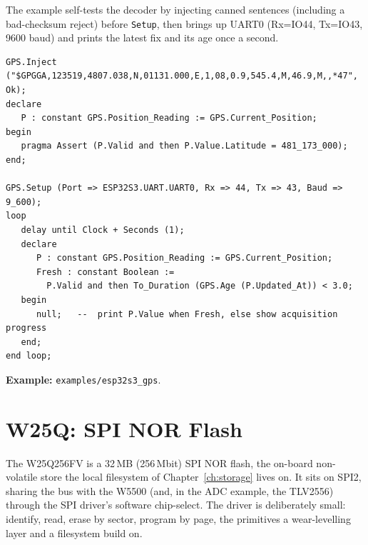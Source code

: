The example self-tests the decoder by injecting canned sentences (including a
bad-checksum reject) before \texttt{Setup}, then brings up UART0 (Rx=IO44, Tx=IO43,
9600 baud) and prints the latest fix and its age once a second.

\begin{lstlisting}
GPS.Inject ("$GPGGA,123519,4807.038,N,01131.000,E,1,08,0.9,545.4,M,46.9,M,,*47", Ok);
declare
   P : constant GPS.Position_Reading := GPS.Current_Position;
begin
   pragma Assert (P.Valid and then P.Value.Latitude = 481_173_000);
end;

GPS.Setup (Port => ESP32S3.UART.UART0, Rx => 44, Tx => 43, Baud => 9_600);
loop
   delay until Clock + Seconds (1);
   declare
      P : constant GPS.Position_Reading := GPS.Current_Position;
      Fresh : constant Boolean :=
        P.Valid and then To_Duration (GPS.Age (P.Updated_At)) < 3.0;
   begin
      null;   --  print P.Value when Fresh, else show acquisition progress
   end;
end loop;
\end{lstlisting}

\noindent\textbf{Example:} \texttt{examples/esp32s3\_gps}.

\section{W25Q: SPI NOR Flash}
\label{app:ext:w25q}

The W25Q256FV is a 32\,MB (256\,Mbit) SPI NOR flash, the on-board non-volatile
store the local filesystem of Chapter~\ref{ch:storage} lives on. It sits on SPI2,
sharing the bus with the W5500 (and, in the ADC example, the TLV2556) through the
SPI driver's software chip-select. The driver is deliberately small: identify, read,
erase by sector, program by page, the primitives a wear-levelling layer and a
filesystem build on.

